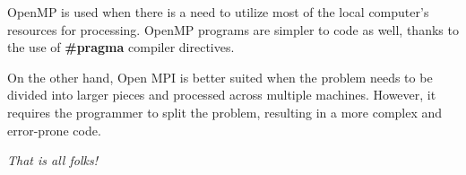 		\par OpenMP is used when there is a need to utilize most of the local computer's resources for processing. OpenMP programs are simpler to code as well, thanks to the use of \textbf{\#pragma} compiler directives.
		
		\par On the other hand, Open MPI is better suited when the problem needs to be divided into larger pieces and processed across multiple machines. However, it requires the programmer to split the problem, resulting in a more complex and error-prone code.
		
		\par \textit{That is all folks!}
	
	
	
